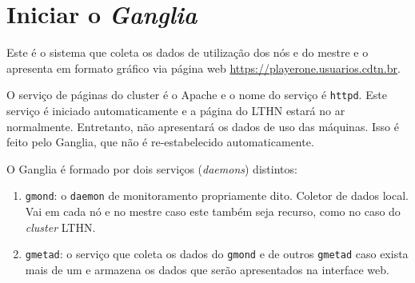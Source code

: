 %


\section{Iniciar o \textit{Ganglia}}
Este é o sistema que coleta os dados de utilização dos nós e do mestre e o apresenta em formato gráfico via página
web \url{https://playerone.usuarios.cdtn.br}.

O serviço de páginas do cluster é o Apache e o nome do serviço é \texttt{httpd}. Este serviço é iniciado automaticamente e
a página do LTHN estará no ar normalmente. Entretanto, não apresentará os dados de uso das máquinas. Isso é feito pelo
Ganglia, que não é re-estabelecido automaticamente.

O Ganglia é formado por dois serviços (\textit{daemons}) distintos:

\begin{enumerate}
\item \texttt{gmond}: o \texttt{daemon} de monitoramento propriamente dito. Coletor de dados local. Vai em cada nó e no mestre caso este também seja recurso, como no caso do \textit{cluster} LTHN.
\item \texttt{gmetad}: o serviço que coleta os dados do \texttt{gmond} e de outros \texttt{gmetad} caso exista mais de um e armazena os dados que serão apresentados na interface web.
\end{enumerate}


